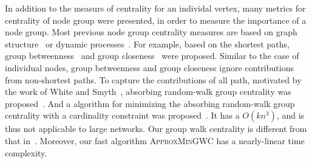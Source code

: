\documentclass[10pt,twocolumn,twoside]{IEEEtran}
\begin{document}

In addition to the measurs of centrality for an individal vertex,  many metrics for centrality of node group were presented, in order to measure the importance of a node group. Most previous  node group centrality measures are based on graph structure~\cite{XuReLiYuLi17} or dynamic processes~\cite{MaMaGi15}. For example, based on the shortest paths, group betweenness~\cite{DoelPuZi09,Yo14,MaTsUp16} and group closeness~\cite{EvBo99,ZhLuToGu14,BeGoMe18} were proposed. Similar to the case of individual nodes, group betweenness and group closeness ignore contributions from non-shortest paths. To capture the contributions of all path, motivated by the work of White and Smyth~\cite{WhSm03}, absorbing random-walk group centrality was proposed~\cite{MaMaGi15}. And a algorithm for minimizing the absorbing random-walk group centrality with a cardinality constraint was proposed~\cite{MaMaGi15}. It has a $O(kn^3)$, and is thus not applicable to large networks.
Our group walk centrality is different from that in~\cite{MaMaGi15}. Moreover,  our fast algorithm \textsc{ApproxMinGWC} has a nearly-linear time complexity.


\end{document}
